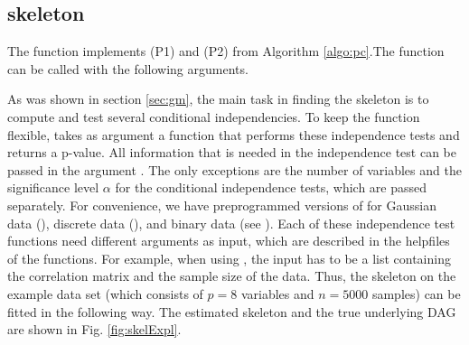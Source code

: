\documentclass[article]{jss}
\begin{document}
\subsection{skeleton}
The function  implements (P1) and (P2) from Algorithm
\ref{algo:pc}.The function can be called with the following arguments.


As was shown in section \ref{sec:gm}, the main task in finding the skeleton
is to compute and test several conditional independencies. To keep the
function flexible,  takes as argument a function
 that performs these independence tests and returns a
p-value. All information that is needed in the independence test can be
passed in the argument . The only exceptions are the number
of variables  and the significance level $\alpha$ for the conditional
independence tests, which are passed separately. For
convenience, we have preprogrammed versions of  for
Gaussian data (), discrete data (),
and binary data (see ). Each of these independence test
functions need different arguments as input, which are described in the
helpfiles of the functions. For example, when using
, the input has to be a list containing the correlation
matrix and the sample size of the data. Thus, the skeleton on the example
data set  (which consists of $p=8$ variables and
$n=5000$ samples) can be fitted in the following way. The estimated
skeleton and the true underlying DAG are shown in Fig. \ref{fig:skelExpl}.
\end{document}
